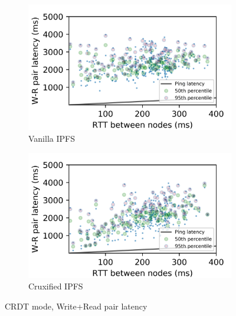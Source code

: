 \documentclass[a4paper,11pt,oneside]{report}
\begin{document}
\begin{figure}[htbp!]
\centering
\begin{subfigure}{.5\textwidth}
  \centering
  \includegraphics[width=1\linewidth]{graphs/plot_zoom_vanilla_raft.png}
  \caption{Vanilla IPFS}
  \label{fig:crdt1}
\end{subfigure}%
\begin{subfigure}{.5\textwidth}
  \centering
  \includegraphics[width=1\linewidth]{graphs/plot_zoom_cruxified_raft.png}
  \caption{Cruxified IPFS}
  \label{fig:crdt2}
\end{subfigure}
\caption{CRDT mode, Write+Read pair latency}
\label{fig:crdt}
\end{figure}
\end{document}
